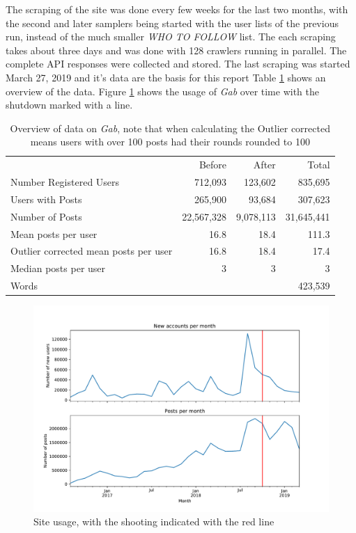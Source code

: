 \documentclass[letterpaper]{article}
\begin{document}
The scraping of the site was done every few weeks for the last two months, with the second and later samplers being started with the user lists of the previous run, instead of the much smaller \textit{WHO TO FOLLOW} list. The each scraping takes about three days and was done with 128 crawlers running in parallel. The complete API responses were collected and stored. The last scraping was started March 27, 2019 and it's data are the basis for this report Table \ref{g_stats} shows an overview of the data. Figure \ref{over_time} shows the usage of \textit{Gab} over time with the shutdown marked with a line.

\begin{table}[h]
	\centering
	\begin{tabular}{lrrr}
		\toprule
		&Before&After&Total\\
		Number Registered Users &712,093&123,602&835,695\\
		Users with Posts& 265,900& 93,684&307,623\\
		Number of Posts& 22,567,328& 9,078,113&31,645,441\\
		Mean posts per user &16.8 &18.4&111.3\\
		Outlier corrected mean posts per user &16.8 &18.4&17.4\\
		Median posts per user &3&3&3\\
		Words &&&423,539\\
		\bottomrule
	\end{tabular}
\caption{Overview of data on \textit{Gab}, note that when calculating the Outlier corrected means users with over 100 posts had their rounds rounded to 100}\label{g_stats}

\end{table}

\begin{figure}[h!]
	\centering
	\includegraphics[width=\textwidth]{Before_and_after_counts.pdf}
	\caption{Site usage, with the shooting indicated with the red line}\label{over_time}
\end{figure}
\end{document}
